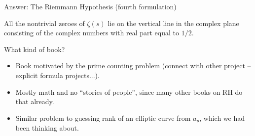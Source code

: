 \documentclass{beamer}
\begin{document}
\begin{frame}{Answer: The Riemmann Hypothesis (fourth formulation)}
  \begin{block}{}
    All the nontrivial zeroes of $\zeta(s)$ lie on the vertical
    line in the complex plane consisting of the
    complex numbers with real part equal to $1/2$.
  \end{block}
\end{frame}


\begin{frame}{What kind of book?}
  \begin{itemize}
    \item   Book motivated by the prime counting problem (connect with other project -- explicit formula projects...).
    \item Mostly math and no ``stories of people'', since many other books on RH do that already.
    \item Similar problem to guessing rank of an elliptic curve from $a_p$, which we had been thinking about.
  \end{itemize}
\end{frame}
\end{document}
